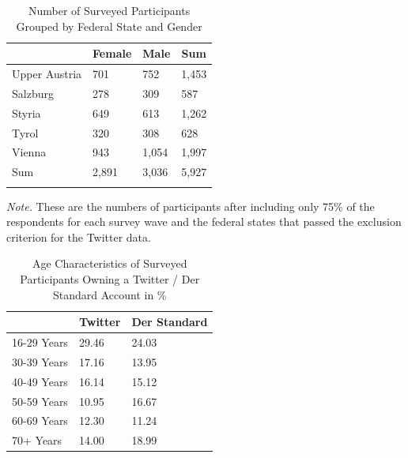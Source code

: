 \documentclass[
  english,
  jou,floatsintext]{apa7}
\begin{document}
\begin{table}[tbp]

\begin{center}
\begin{threeparttable}

\caption{\label{tab:Table-2}Number of Surveyed Participants Grouped by Federal State and Gender}

\small{

\begin{tabular}{m{1.65cm}m{1.65cm}m{1.65cm}m{1.65cm}}
\toprule
 & \multicolumn{1}{c}{Female} & \multicolumn{1}{c}{Male} & \multicolumn{1}{c}{Sum}\\
\midrule
Upper Austria & 701 & 752 & 1,453\\
Salzburg & 278 & 309 & 587\\
Styria & 649 & 613 & 1,262\\
Tyrol & 320 & 308 & 628\\
Vienna & 943 & 1,054 & 1,997\\
Sum & 2,891 & 3,036 & 5,927\\
\bottomrule
\addlinespace
\end{tabular}

}

\begin{tablenotes}[para]
\normalsize{\textit{Note.} These are the numbers of participants after including only 75\% of the respondents for each survey wave and the federal states that passed the exclusion criterion for the Twitter data.}
\end{tablenotes}

\end{threeparttable}
\end{center}

\end{table}

\begin{table}[tbp]

\begin{center}
\begin{threeparttable}

\caption{\label{tab:Table-3}Age Characteristics of Surveyed Participants Owning a Twitter / Der Standard Account in \%}

\small{

\begin{tabular}{m{2.35cm}m{2.35cm}m{2.35cm}}
\toprule
 & \multicolumn{1}{c}{Twitter} & \multicolumn{1}{c}{Der Standard}\\
\midrule
16-29 Years & 29.46 & 24.03\\
30-39 Years & 17.16 & 13.95\\
40-49 Years & 16.14 & 15.12\\
50-59 Years & 10.95 & 16.67\\
60-69 Years & 12.30 & 11.24\\
70+ Years & 14.00 & 18.99\\
\bottomrule
\end{tabular}

}

\end{threeparttable}
\end{center}

\end{table}
\end{document}
